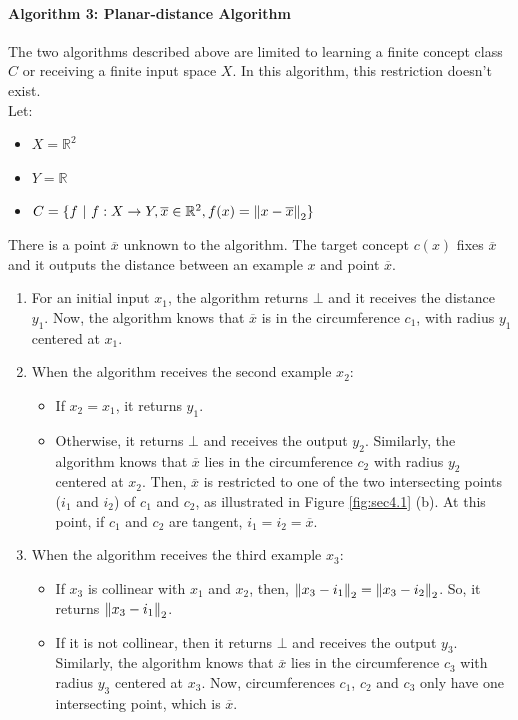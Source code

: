 \paragraph{Algorithm 3: Planar-distance Algorithm}
The two algorithms described above are limited to learning a finite concept
class $C$ or receiving a finite input space $X$. In this algorithm, this
restriction doesn't exist. \\

Let:
\begin{itemize}
  \item $ X = \mathbb{R}^2 $
  \item $ Y = \mathbb{R} $
  \item $ C = \{ f \ | \ f : X \to Y, \overline{x} \in \mathbb{R}^2, f(x) = \left\lVert x - \overline{x}\right\rVert_2 \} $
\end{itemize}

There is a point $\overline{x}$ unknown to the algorithm.  The target concept $c(x)$ fixes $\overline{x}$ and it outputs
the distance between an example $x$ and point $\overline{x}$. \\
\begin{enumerate}
  \item For an initial input $x_1$, the algorithm returns $\bot$ and it receives
  the distance $y_1$. Now, the algorithm knows that $\overline{x}$ is in the
  circumference $c_1$, with radius $y_1$ centered at $x_1$.
  \item When the algorithm receives the second example $x_2$:
  \begin{itemize}
    \item If $x_2 = x_1$, it returns $y_1$.
    \item Otherwise, it returns $\bot$ and receives the output $y_2$. Similarly,
    the algorithm knows that $\overline{x}$ lies in the circumference $c_2$ with
    radius $y_2$ centered at $x_2$. Then, $\overline{x}$ is restricted to one of
    the two intersecting points ($i_1$ and $i_2$) of $c_1$ and $c_2$, as illustrated in Figure
    \ref{fig:sec4.1} (b). At this point, if $c_1$ and $c_2$ are tangent, $i_1 =
    i_2 = \overline{x}$.
  \end{itemize}
  \item When the algorithm receives the third example $x_3$:
  \begin{itemize}
    \item If $x_3$ is collinear with $x_1$ and $x_2$, then, $\left\lVert x_3 - i_1\right\rVert_2 =
    \left\lVert x_3 - i_2\right\rVert_2$. So, it returns $\left\lVert x_3 - i_1\right\rVert_2$.
    \item If it is not collinear, then it returns $\bot$ and receives the output
    $y_3$. Similarly, the algorithm knows that $\overline{x}$ lies in the
    circumference $c_3$ with radius $y_3$ centered at $x_3$. Now, circumferences
    $c_1$, $c_2$ and $c_3$ only have one intersecting point, which is
    $\overline{x}$.
  \end{itemize}
\end{enumerate}

